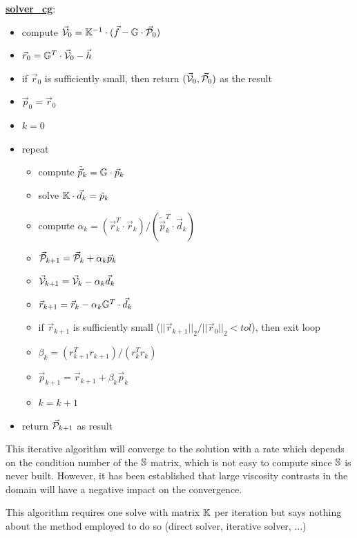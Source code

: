 \begin{mdframed}[backgroundcolor=blue!5]
\underline{\bf solver\_cg}:
\begin{itemize}
\item compute $\vec{\cal V}_0={\mathbb{K}}^{-1}\cdot (\vec{f}-{\mathbb{G}} \cdot \vec{\cal P}_0)$
\item $\vec{r}_0 = {\mathbb{G}}^T\cdot \vec{\cal V}_0 - \vec{h}$ 
\item if $\vec{r}_0$ is sufficiently small, then return $(\vec{\cal V}_0,\vec{\cal P}_0)$ as the result
\item $\vec{p}_0=\vec{r}_0$
\item $k=0$
\item repeat
\begin{itemize}
\item compute $\tilde{\vec{p}}_k = {\mathbb{G}} \cdot \vec{p}_k$
\item solve ${\mathbb{K}}\cdot \vec{d}_k = \tilde{p}_k$
\item compute $\alpha_k=(\vec{r}_k^T \cdot  \vec{r}_k)/(\tilde{\vec{p}}_k^T \cdot \vec{d}_k)$
\item $\vec{\cal P}_{k+1} = \vec{\cal P}_k+\alpha_k \vec{p}_k$
\item $ \vec{\cal V}_{k+1} = \vec{\cal V}_k - \alpha_k \vec{d}_k$
\item $\vec{r}_{k+1} = \vec{r}_k - \alpha_k {\mathbb{G}}^T \cdot \vec{d}_k $
\item if $\vec{r}_{k+1}$ is sufficiently small ($||\vec{r}_{k+1}||_2/||\vec{r}_0||_2 <tol$), then exit loop
\item $\beta_k=(r_{k+1}^T r_{k+1})/(r_k^T r_k)$
\item $\vec{p}_{k+1} =\vec{r}_{k+1}+ \beta_k \vec{p}_k$
\item $k=k+1$
\end{itemize}
\item return $\vec{\cal P}_{k+1}$ as result
\end{itemize}
\end{mdframed}

This iterative algorithm will converge to the solution with a rate which depends on 
the condition number of the ${\mathbb{S}}$ matrix, which is not easy to compute since 
${\mathbb{S}}$ is never built. However, it has been established that large viscosity contrasts in the domain 
will have a negative impact on the convergence. 

\begin{remark} 
This algorithm requires one solve with matrix ${\mathbb{K}}$ per iteration 
but says nothing about the method employed to do so (direct solver, iterative solver, ...)
\end{remark} 

